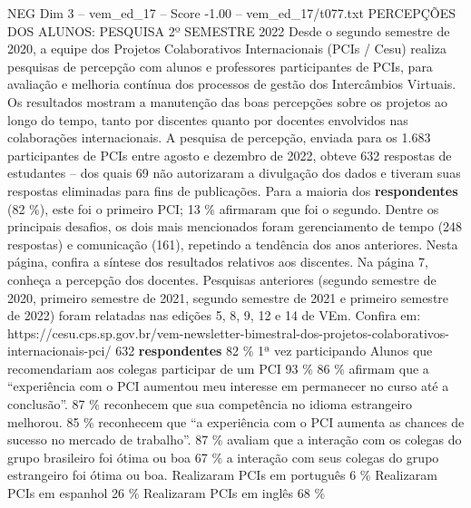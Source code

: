 \begin{textsample}{NEG Dim 3 – vem\_ed\_17 – Score -1.00 – vem\_ed\_17/t077.txt}  \label{ex:f3_neg_033}
PERCEPÇÕES DOS ALUNOS: PESQUISA 2º SEMESTRE 2022 Desde o segundo semestre de 2020, a equipe dos Projetos Colaborativos Internacionais (PCIs / Cesu) realiza pesquisas de percepção com alunos e professores participantes de PCIs, para avaliação e melhoria contínua dos processos de gestão dos Intercâmbios Virtuais.
Os resultados mostram a manutenção das boas percepções sobre os projetos ao longo do tempo, tanto por discentes quanto por docentes envolvidos nas colaborações internacionais.
A pesquisa de percepção, enviada para os 1.683 participantes de PCIs entre agosto e dezembro de 2022, obteve 632 respostas de estudantes – dos quais 69 não autorizaram a divulgação dos dados e tiveram suas respostas eliminadas para fins de publicações.
Para a maioria dos \textbf{respondentes} (82 \%), este foi o primeiro PCI; 13 \% afirmaram que foi o segundo.
Dentre os principais desafios, os dois mais mencionados foram gerenciamento de tempo (248 respostas) e comunicação (161), repetindo a tendência dos anos anteriores.
Nesta página, confira a síntese dos resultados relativos aos discentes.
Na página 7, conheça a percepção dos docentes.
Pesquisas anteriores (segundo semestre de 2020, primeiro semestre de 2021, segundo semestre de 2021 e primeiro semestre de 2022) foram relatadas nas edições 5, 8, 9, 12 e 14 de VEm.
Confira em: https://cesu.cps.sp.gov.br/vem-newsletter-bimestral-dos-projetos-colaborativos-internacionais-pci/ 632 \textbf{respondentes} 82 \% 1ª vez participando Alunos que recomendariam aos colegas participar de um PCI 93 \% 86 \% afirmam que a “experiência com o PCI aumentou meu interesse em permanecer no curso até a conclusão”. 87 \% reconhecem que sua competência no idioma estrangeiro melhorou. 85 \% reconhecem que “a experiência com o PCI aumenta as chances de sucesso no mercado de trabalho”. 87 \% avaliam que a interação com os colegas do grupo brasileiro foi ótima ou boa 67 \% a interação com seus colegas do grupo estrangeiro foi ótima ou boa.
Realizaram PCIs em português 6 \% Realizaram PCIs em espanhol 26 \% Realizaram PCIs em inglês 68 \%

\end{textsample}
